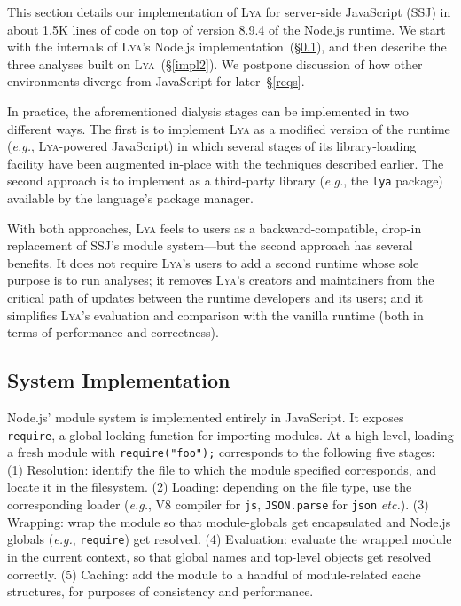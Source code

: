 \documentclass[letterpaper,twocolumn,10pt]{article}
\def\eg{{\em e.g.}, }
\def\etc{{\em etc.}\xspace}
\newcommand{\ttt}[1]{\texttt{#1}}
\newcommand{\sx}[1]{(\S\ref{#1})}
\newcommand{\sys}{{\scshape Lya}\xspace}
\begin{document}
This section details our implementation of \sys for server-side JavaScript (SSJ) in about 1.5K lines of code on top of version 8.9.4 of the Node.js runtime.
We start with the internals of \sys's Node.js implementation~\sx{impl1}, and then describe the three analyses built on \sys~\sx{impl2}.
We postpone discussion of how other environments diverge from JavaScript for later~\S\ref{reqs}.

In practice, the aforementioned dialysis stages can be implemented in two different ways.
The first is to implement \sys as a modified version of the runtime (\eg \sys-powered JavaScript) in which several stages of its library-loading facility have been augmented in-place with the techniques described earlier.
The second approach is to implement as a third-party library (\eg the \ttt{lya} package) available by the language's package manager.

With both approaches, \sys feels to users as a backward-compatible, drop-in replacement of SSJ's module system---but the second approach has several benefits.
It does not require \sys's users to add a second runtime whose sole purpose is to run analyses;
  it removes \sys's creators and maintainers from the critical path of updates between the runtime developers and its users; 
  and it simplifies \sys's evaluation and comparison with the vanilla runtime (both in terms of performance and correctness).


\subsection{System Implementation}
\label{impl1}


Node.js' module system is implemented entirely in JavaScript.
It exposes \ttt{require}, a global-looking function for importing modules.
At a high level, loading a fresh module with \ttt{require("foo");} corresponds to the following five stages:
(1) Resolution: identify the file to which the module specified corresponds, and locate it in the filesystem.
(2) Loading: depending on the file type, use the corresponding loader (\eg V8 compiler for \ttt{js}, \ttt{JSON.parse} for \ttt{json} \etc).
(3) Wrapping: wrap the module so that module-globals get encapsulated and Node.js globals (\eg \ttt{require}) get resolved.
(4) Evaluation: evaluate the wrapped module in the current context, so that global names and top-level objects get resolved correctly.
(5) Caching: add the module to a handful of module-related cache structures, for purposes of consistency and performance.
\end{document}
